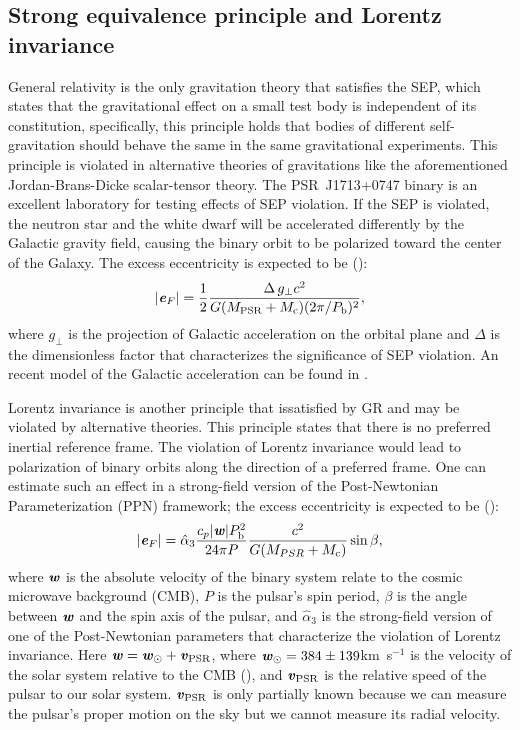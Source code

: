 \subsection{Strong equivalence principle and Lorentz invariance}
\label{sec:sep}
General relativity is the only gravitation theory that satisfies
the SEP, which states that the gravitational
effect on a small test body is independent of its constitution, specifically,
this principle holds that bodies of different self-gravitation should behave the same in
the same gravitational experiments. This principle is violated in alternative
theories of gravitations like the aforementioned Jordan-Brans-Dicke
scalar-tensor theory. The PSR~J1713+0747 binary is an excellent laboratory for testing 
effects of SEP violation. If the SEP is violated, the neutron star and the white
dwarf will be accelerated differently by the Galactic gravity field, causing
the binary orbit to be polarized toward the center of the Galaxy. The excess 
eccentricity is expected to be (\citealt{ds91}):
\begin{equation}
|\textbf{\textit{e}}_F| = \frac{1}{2}\frac{\Delta\, g_{\bot}
  c^2}{G(M_{\rm PSR}+M_{\rm
c})(2\pi/P_{\rm b})^2},
\end{equation}
where $g_{\bot}$ is the projection of Galactic acceleration on the orbital plane 
and $\Delta$ is the dimensionless factor that characterizes the significance 
of SEP violation. An recent model of the Galactic acceleration can be found in
\citealt{hf04a}.

Lorentz invariance is another principle that issatisfied by GR and may
be violated by alternative theories. This principle
states that there is no preferred inertial reference frame. The violation of
Lorentz invariance would lead to polarization of binary orbits along the
direction of a preferred frame.
One can estimate such an effect in a strong-field version of the Post-Newtonian Parameterization
(PPN) framework\cite{de92}; the excess eccentricity is expected to be (\citealt{bd96}):
\begin{equation}
|\textbf{\textit{e}}_F| = \hat{\alpha}_3 \frac{c_p|\textbf{\textit{w}}|P_{\rm b}^2}{24\pi P}
\frac{c^2}{G (M_{PSR}+M_{\rm c})}\sin \beta,
\end{equation}
where $\textbf{\textit{w}}$ is the absolute velocity of the binary system
relate to the cosmic microwave background (CMB), $P$ is the pulsar's spin period, $\beta$ is the
angle between $\textbf{\textit{w}}$ and the spin axis of the pulsar, and
$\hat{\alpha}_3$ is the strong-field version of one of the Post-Newtonian parameters that characterize the
violation of Lorentz invariance. 
Here $\textbf{\textit{w}} = \textbf{\textit{w}}_{\odot} + \textbf{\textit{v}}_{\rm PSR}$, where
$\textbf{\textit{w}}_{\odot}=384\pm139$km~s$^{-1}$ is the velocity of
the solar system relative to the CMB (\citealt{aaa+13}),
and $\textbf{\textit{v}}_{\rm PSR}$ is the relative speed of the pulsar to our solar system. $\textbf{\textit{v}}_{\rm PSR}$ is only partially known because we can measure the pulsar's
proper motion on the sky but we cannot measure its radial velocity.

